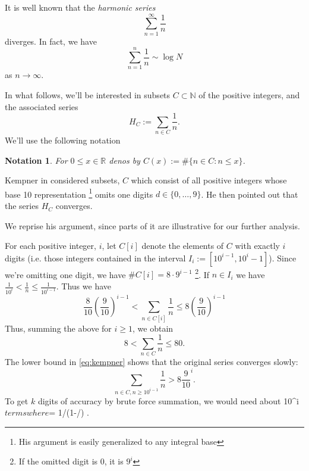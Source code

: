 \documentclass{article}
\newtheorem{notation}[section]{Notation}
\begin{document}
It is well known that the \emph{harmonic series}
\begin{displaymath}
  \sum_{n=1}^\infty \frac{1}{n}
\end{displaymath}
diverges. In fact, we have
\begin{displaymath}
  \sum_{n=1}^n \frac{1}{n} \sim \log N
\end{displaymath}
as $n \rightarrow \infty$.

In what follows, we'll be interested in subsets $C \subset \mathbb{N}$
of the positive integers, and the associated series
\begin{equation}
  \label{eq:harmonic}
  H_C := \sum_{n \in C} \frac{1}{n}.
\end{equation}
We'll use the following notation
\begin{notation}
  For $0 \le x \in \mathbb{R}$ denos by $C(x) := \#\{n \in C: n \le x\}$.
\end{notation}

Kempner in \cite{kempner1914curious}
considered subsets, $C$ which consist of all positive integers whose
base 10 representation
\footnote{His
  argument is easily generalized to any integral base}
omits one digits $d \in \{0,\dots,9\}$. He then
pointed out that the series $H_C$ converges.

We reprise his argument, since parts of it are illustrative for our
further analysis.

For each positive integer, $i$, let $C[i]$ denote the elements of
$C$ with exactly $i$ digits (i.e. those integers contained in the
interval
$I_i := [10^{i-1}, 10^i -1]$).
Since we're omitting one digit, we have $\# C[i] = 8\cdot 9^{i-1}$
\footnote{If the omitted digit is 0, it is $9^i$}. If $n\in I_i$ we
have $\frac{1}{10^i} < \frac{1}{n} \le \frac{1}{10^{i-1}}$.
Thus we have
\begin{equation}
\label{eq:kempner}
\frac{8}{10}\left(\frac{9}{10}\right)^{i-1}
< \sum_{n \in C[i]} \frac{1}{n} \le 8\left(\frac{9}{10}\right)^{i-1}
\end{equation}
Thus, summing the above for $i\ge 1$, we obtain
\begin{displaymath}
  8 < \sum_{n \in C} \frac{1}{n} \le 80.
\end{displaymath}
The lower bound in \eqref{eq:kempner} shows that the original series
converges slowly:
\begin{displaymath}
  \sum_{n \in C, n \ge 10^{i-1}} \frac{1}{n} > 8 \frac{9}{10}^i.
\end{displaymath}
To get $k$ digits of accuracy by brute force summation, we would need
about 10^{\alpha i}$ terms where $\alpha = 1/(1-/)
.
\end{document}
